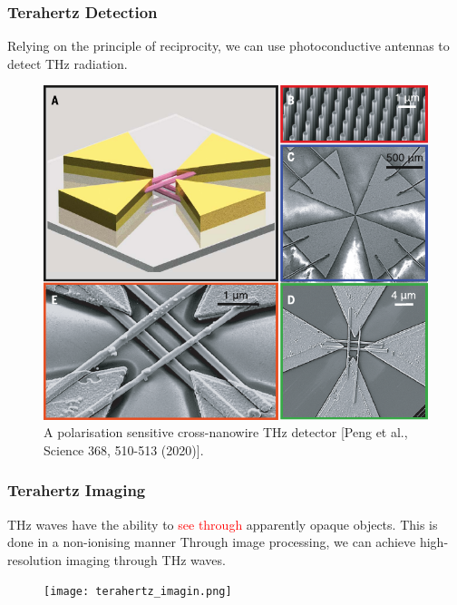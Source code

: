 \documentclass[10pt]{beamer}
\begin{document}
\begin{frame}
    \frametitle{Terahertz Detection}
    Relying on the principle of reciprocity, we can use photoconductive antennas to detect THz radiation.
    \begin{figure}[h!]
        \centering
        \includegraphics[width=.45\textwidth]{terahertz_applications.pdf}
        \caption{A polarisation sensitive cross-nanowire THz detector \tiny{[Peng et al., Science 368, 510-513 (2020)]}.}
    \end{figure}
\end{frame}

\begin{frame}
    \frametitle{Terahertz Imaging}
    \begin{outline}
        \1 THz waves have the ability to \textcolor{red}{see through} apparently opaque objects.
        \1 This is done in a non-ionising manner
        \1 Through image processing, we can achieve high-resolution imaging through THz waves.
    \end{outline}
    \begin{figure}[h!]
        \centering
        \texttt{[image: terahertz\_imagin.png]}
    \end{figure}
\end{frame}
\end{document}

